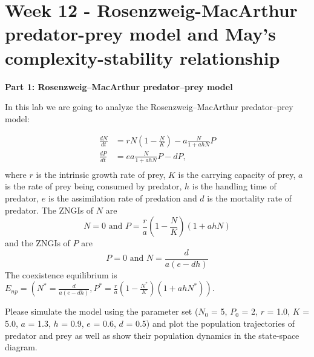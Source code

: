 \documentclass[
]{book}
\begin{document}
\hypertarget{week-12---rosenzweig-macarthur-predator-prey-model-and-mays-complexity-stability-relationship}{%
\chapter*{Week 12 - Rosenzweig-MacArthur predator-prey model and May's complexity-stability relationship}\label{week-12---rosenzweig-macarthur-predator-prey-model-and-mays-complexity-stability-relationship}}

\textbf{Part 1: Rosenzweig--MacArthur predator--prey model}

In this lab we are going to analyze the Rosenzweig--MacArthur predator--prey model:

\begin{align*}
\frac {dN}{dt} &= rN(1-\frac{N}{K})-a\frac{N}{1+ahN}P\\
\frac {dP}{dt} &= ea\frac{N}{1+ahN}P-dP,\\
\end{align*}
where \(r\) is the intrinsic growth rate of prey, \(K\) is the carrying capacity of prey, \(a\) is the rate of prey being consumed by predator, \(h\) is the handling time of predator, \(e\) is the assimilation rate of predation and \(d\) is the mortality rate of predator. The ZNGIs of \(N\) are
\[
N = 0 \text{ and } P = \frac{r}{a}(1-\frac{N}{K})(1+ahN)
\]
and the ZNGIs of \(P\) are
\[
P = 0 \text{ and } N = \frac{d}{a(e-dh)}
\]
The coexistence equilibrium is \(E_{np} = \left(N^* = \frac{d}{a(e-dh)}, P^* = \frac{r}{a}(1-\frac{N^*}{K})(1+ahN^*)\right)\).

Please simulate the model using the parameter set (\(N_0\) = 5, \(P_0\) = 2, \(r\) = 1.0, \(K\) = 5.0, \(a\) = 1.3, \(h\) = 0.9, \(e\) = 0.6, \(d\) = 0.5) and plot the population trajectories of predator and prey as well as show their population dynamics in the state-space diagram.
\end{document}
